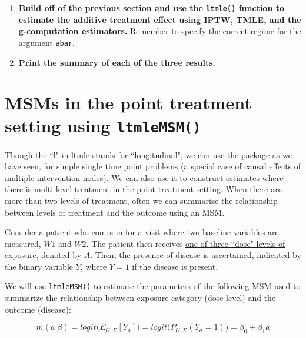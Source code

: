\documentclass[answers]{exam}
\begin{document}
\begin{enumerate}
\item \textbf{Build off of the previous section and use the \texttt{ltmle()} function to estimate the additive treatment effect using IPTW, TMLE, and the g-computation estimators.} Remember to specify the correct regime for the argument \texttt{abar}.
\item \textbf{Print the summary of each of the three results.}
\end{enumerate}



\section{MSMs in the point treatment setting using \texttt{ltmleMSM()}}


Though the ``l" in ltmle stands for ``longitudinal", we can use the package as we have seen, for simple single time point problems (a special case of causal effects of multiple intervention nodes). We can also use it to construct estimates where there is multi-level treatment in the point treatment setting. When there are more than two levels of treatment, often we can summarize the relationship between levels of treatment and the outcome using an MSM. 

Consider a patient who comes in for a visit where two baseline variables are measured, $W1$ and $W2$. The patient then receives \underline{one of three ``dose" levels of exposure}, denoted by $A$. Then, the presence of disease is ascertained, indicated by the binary variable $Y$, where $Y = 1$ if the disease is present. 

We will use \texttt{ltmleMSM()} to estimate the parameters of the following MSM used to summarize the relationship between exposure category (dose level) and the outcome (disease):

\[
m(a|\beta) = logit\big(E_{U,X}[Y_a]\big) = logit\big(P_{U,X}(Y_a = 1)\big) =  \beta_0 + \beta_1a
\]
\end{document}
